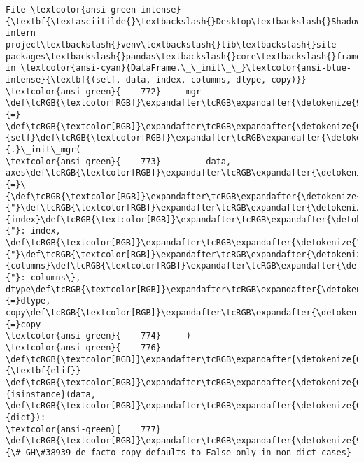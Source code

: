 \documentclass[11pt]{article}
\begin{document}
\begin{Verbatim}[commandchars=\\\{\}, frame=single, framerule=2mm, rulecolor=\color{outerrorbackground}]
File \textcolor{ansi-green-intense}{\textbf{\textasciitilde{}\textbackslash{}Desktop\textbackslash{}Shadowfox intern project\textbackslash{}venv\textbackslash{}lib\textbackslash{}site-packages\textbackslash{}pandas\textbackslash{}core\textbackslash{}frame.py:778}}, in \textcolor{ansi-cyan}{DataFrame.\_\_init\_\_}\textcolor{ansi-blue-intense}{\textbf{(self, data, index, columns, dtype, copy)}}
\textcolor{ansi-green}{    772}     mgr \def\tcRGB{\textcolor[RGB]}\expandafter\tcRGB\expandafter{\detokenize{98,98,98}}{=} \def\tcRGB{\textcolor[RGB]}\expandafter\tcRGB\expandafter{\detokenize{0,135,0}}{self}\def\tcRGB{\textcolor[RGB]}\expandafter\tcRGB\expandafter{\detokenize{98,98,98}}{.}\_init\_mgr(
\textcolor{ansi-green}{    773}         data, axes\def\tcRGB{\textcolor[RGB]}\expandafter\tcRGB\expandafter{\detokenize{98,98,98}}{=}\{\def\tcRGB{\textcolor[RGB]}\expandafter\tcRGB\expandafter{\detokenize{175,0,0}}{"}\def\tcRGB{\textcolor[RGB]}\expandafter\tcRGB\expandafter{\detokenize{175,0,0}}{index}\def\tcRGB{\textcolor[RGB]}\expandafter\tcRGB\expandafter{\detokenize{175,0,0}}{"}: index, \def\tcRGB{\textcolor[RGB]}\expandafter\tcRGB\expandafter{\detokenize{175,0,0}}{"}\def\tcRGB{\textcolor[RGB]}\expandafter\tcRGB\expandafter{\detokenize{175,0,0}}{columns}\def\tcRGB{\textcolor[RGB]}\expandafter\tcRGB\expandafter{\detokenize{175,0,0}}{"}: columns\}, dtype\def\tcRGB{\textcolor[RGB]}\expandafter\tcRGB\expandafter{\detokenize{98,98,98}}{=}dtype, copy\def\tcRGB{\textcolor[RGB]}\expandafter\tcRGB\expandafter{\detokenize{98,98,98}}{=}copy
\textcolor{ansi-green}{    774}     )
\textcolor{ansi-green}{    776} \def\tcRGB{\textcolor[RGB]}\expandafter\tcRGB\expandafter{\detokenize{0,135,0}}{\textbf{elif}} \def\tcRGB{\textcolor[RGB]}\expandafter\tcRGB\expandafter{\detokenize{0,135,0}}{isinstance}(data, \def\tcRGB{\textcolor[RGB]}\expandafter\tcRGB\expandafter{\detokenize{0,135,0}}{dict}):
\textcolor{ansi-green}{    777}     \def\tcRGB{\textcolor[RGB]}\expandafter\tcRGB\expandafter{\detokenize{95,135,135}}{\# GH\#38939 de facto copy defaults to False only in non-dict cases}

\end{Verbatim}
\end{document}
